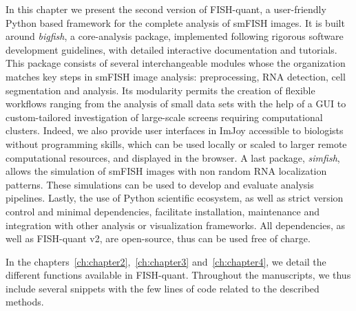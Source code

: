 In this chapter we present the second version of FISH-quant, a user-friendly Python based framework for the complete analysis of \ac{smFISH} images.
It is built around \emph{bigfish}, a core-analysis package, implemented following rigorous software development guidelines, with detailed interactive documentation and tutorials.
This package consists of several interchangeable modules whose the organization matches key steps in \ac{smFISH} image analysis: preprocessing, \ac{RNA} detection, cell segmentation and analysis.
Its modularity permits the creation of flexible workflows ranging from the analysis of small data sets with the help of a \ac{GUI} to custom-tailored investigation of large-scale screens requiring computational clusters.
Indeed, we also provide user interfaces in ImJoy accessible to biologists without programming skills, which can be used locally or scaled to larger remote computational resources, and displayed in the browser.
A last package, \emph{simfish}, allows the simulation of \ac{smFISH} images with non random \ac{RNA} localization patterns.
These simulations can be used to develop and evaluate analysis pipelines.
Lastly, the use of Python scientific ecosystem, as well as strict version control and minimal dependencies, facilitate installation, maintenance and integration with other analysis or visualization frameworks.
All dependencies, as well as FISH-quant v2, are open-source, thus can be used free of charge.

In the chapters~\ref{ch:chapter2},~\ref{ch:chapter3} and~\ref{ch:chapter4}, we detail the different functions available in FISH-quant.
Throughout the manuscripts, we thus include several snippets with the few lines of code related to the described methods.
